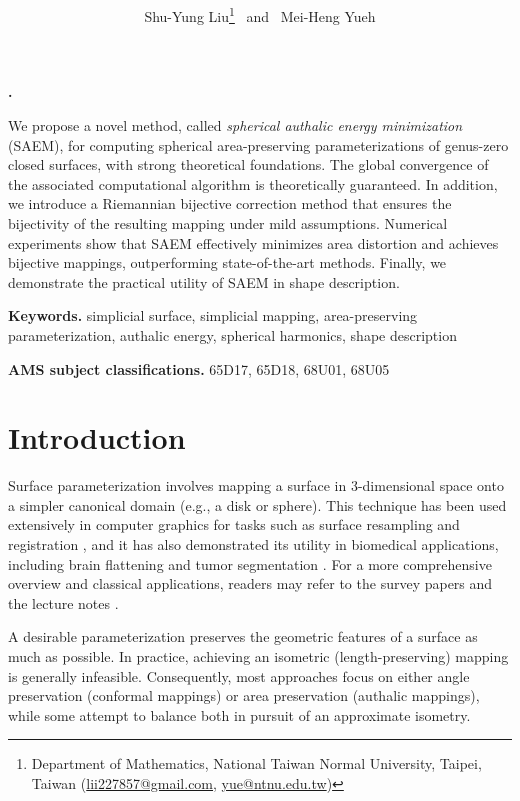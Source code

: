 \documentclass{article}
\title{ 
\bfseries\sffamily{
Spherical Area-Preserving Parameterization via Energy Minimization}

}
\author{
\sffamily
{Shu-Yung Liu\thanks{\footnotesize Department of Mathematics, National Taiwan Normal University, Taipei, Taiwan (\href{mailto:lii227857@gmail.com}{lii227857@gmail.com}, \href{mailto:yue@ntnu.edu.tw}{yue@ntnu.edu.tw}) }
\, and \, Mei-Heng Yueh\samethanks[1] }  
}
\date{}
\numberwithin{equation}{section}
\renewenvironment{abstract}{
  \quotation
  \textbf{\textsf{{\abstractname.}}}
  \sffamily
}{\endquotation}
\begin{document}
\maketitle

\begin{abstract}
We propose a novel method, called {\em spherical authalic energy minimization} (SAEM), for computing spherical area-preserving parameterizations of genus-zero closed surfaces, with strong theoretical foundations. The global convergence of the associated computational algorithm is theoretically guaranteed. In addition, we introduce a Riemannian bijective correction method that ensures the bijectivity of the resulting mapping under mild assumptions. Numerical experiments show that SAEM effectively minimizes area distortion and achieves bijective mappings, outperforming state-of-the-art methods. Finally, we demonstrate the practical utility of SAEM in shape description.

\bigskip
\textbf{Keywords.} simplicial surface, simplicial mapping, area-preserving parameterization, authalic energy, spherical harmonics, shape description 

\medskip
\textbf{AMS subject classifications.} 65D17, 65D18, 68U01, 68U05
\end{abstract}

\section{Introduction}
Surface parameterization involves mapping a surface in 3-dimensional space onto a simpler canonical domain (e.g., a disk or sphere). This technique has been used extensively in computer graphics for tasks such as surface resampling and registration \cite{LaLu14,LuLY14,YoMY14,YuLW17}, and it has also demonstrated its utility in biomedical applications, including brain flattening and tumor segmentation \cite{AnSH99, AnHT99,LiJY21,LiLH22}. For a more comprehensive overview and classical applications, readers may refer to the survey papers \cite{FlHo05,ShPR06} and the lecture notes \cite{HoLe07}.

A desirable parameterization preserves the geometric features of a surface as much as possible. In practice, achieving an isometric (length-preserving) mapping is generally infeasible. Consequently, most approaches focus on either angle preservation (conformal mappings) or area preservation (authalic mappings), while some attempt to balance both in pursuit of an approximate isometry.
\end{document}
